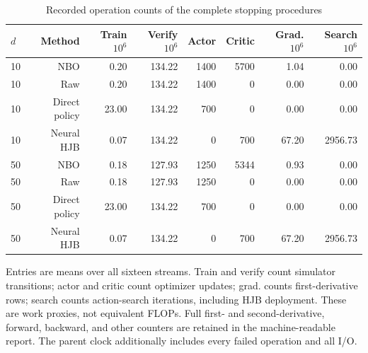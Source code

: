 \begin{table}[!htbp]
\centering\small
\caption{Recorded operation counts of the complete stopping procedures}
\label{tab:r15methodoperations}
\begin{tabular}{lrrrrrrr}
\toprule
$d$ & Method & Train $10^6$ & Verify $10^6$ & Actor & Critic & Grad. $10^6$ & Search $10^6$ \\
\midrule
10 & NBO & 0.20 & 134.22 & 1400 & 5700 & 1.04 & 0.00 \\
10 & Raw & 0.20 & 134.22 & 1400 & 0 & 0.00 & 0.00 \\
10 & Direct policy & 23.00 & 134.22 & 700 & 0 & 0.00 & 0.00 \\
10 & Neural HJB & 0.07 & 134.22 & 0 & 700 & 67.20 & 2956.73 \\
50 & NBO & 0.18 & 127.93 & 1250 & 5344 & 0.93 & 0.00 \\
50 & Raw & 0.18 & 127.93 & 1250 & 0 & 0.00 & 0.00 \\
50 & Direct policy & 23.00 & 134.22 & 700 & 0 & 0.00 & 0.00 \\
50 & Neural HJB & 0.07 & 134.22 & 0 & 700 & 67.20 & 2956.73 \\
\bottomrule
\end{tabular}
\par\medskip\noindent\footnotesize Entries are means over all sixteen streams. Train and verify count simulator transitions; actor and critic count optimizer updates; grad. counts first-derivative rows; search counts action-search iterations, including HJB deployment. These are work proxies, not equivalent FLOPs. Full first- and second-derivative, forward, backward, and other counters are retained in the machine-readable report. The parent clock additionally includes every failed operation and all I/O.
\end{table}
